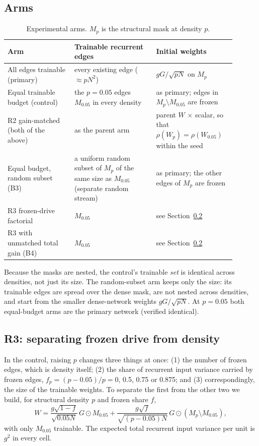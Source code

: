 \documentclass[11pt]{article}
\newcommand{\Mp}[1]{M_{#1}}
\begin{document}
\subsection{Arms}

\begin{table}[ht]
\centering
\small
\caption{Experimental arms. $\Mp{p}$ is the structural mask at density $p$.}
\label{tab:arms}
\begin{tabular}{>{\raggedright}p{0.27\linewidth}>{\raggedright}p{0.33\linewidth}>{\raggedright\arraybackslash}p{0.30\linewidth}}
\toprule
Arm & Trainable recurrent edges & Initial weights\\
\midrule
All edges trainable (primary) & every existing edge ($\approx pN^2$) & $gG/\sqrt{pN}$ on $\Mp{p}$\\
Equal trainable budget (control) & the $p=0.05$ edges $\Mp{0.05}$ in every density & as primary; edges in $\Mp{p}\setminus\Mp{0.05}$ are frozen\\
R2 gain-matched (both of the above) & as the parent arm & parent $W$ $\times$ scalar, so that $\rho(W_p)=\rho(W_{0.05})$ within the seed\\
Equal budget, random subset (B3) & a uniform random subset of $\Mp{p}$ of the same size as $\Mp{0.05}$ (separate random stream) & as primary; the other edges of $\Mp{p}$ are frozen\\
R3 frozen-drive factorial & $\Mp{0.05}$ & see Section~\ref{sec:r3}\\
R3 with unmatched total gain (B4) & $\Mp{0.05}$ & see Section~\ref{sec:r3}\\
\bottomrule
\end{tabular}
\end{table}

Because the masks are nested, the control's trainable \emph{set} is identical
across densities, not just its size. The random-subset arm keeps only the
size: its trainable edges are spread over the dense mask, are not nested
across densities, and start from the smaller dense-network weights
$gG/\sqrt{pN}$. At $p=0.05$ both equal-budget arms are the primary network
(verified identical).

\subsection{R3: separating frozen drive from density}
\label{sec:r3}

In the control, raising $p$ changes three things at once: (1) the number of
frozen edges, which is density itself; (2) the share of recurrent input
variance carried by frozen edges, $f_p=(p-0.05)/p=0$, 0.5, 0.75 or 0.875; and
(3) correspondingly, the size of the trainable weights. To separate the first
from the other two we build, for structural density $p$ and frozen share $f$,
\begin{equation}
W=\frac{g\sqrt{1-f}}{\sqrt{0.05N}}\,G\odot\Mp{0.05}
 +\frac{g\sqrt{f}}{\sqrt{(p-0.05)N}}\,G\odot(\Mp{p}\setminus\Mp{0.05}),
\end{equation}
with only $\Mp{0.05}$ trainable. The expected total recurrent input variance
per unit is $g^2$ in every cell.
\end{document}
